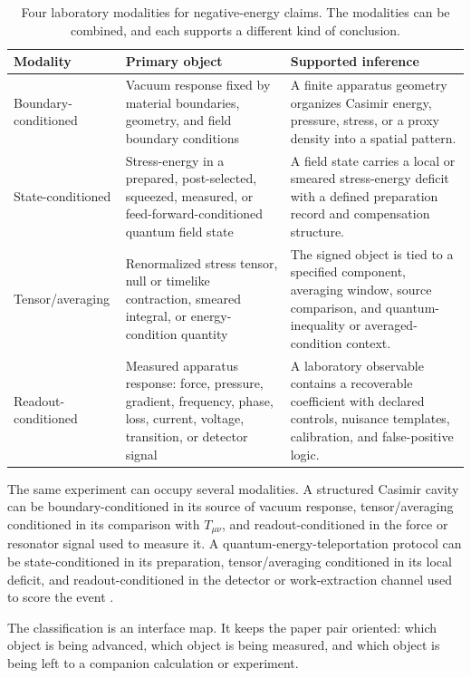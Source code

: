 \documentclass[11pt]{article}
\newcommand{\Tmunu}{T_{\mu\nu}}
\begin{document}
\begin{table}[h]
\centering
\small
\begin{tabularx}{\textwidth}{p{}p{}X}
\toprule
Modality & Primary object & Supported inference \\
\midrule
Boundary-conditioned &
Vacuum response fixed by material boundaries, geometry, and field boundary
conditions &
A finite apparatus geometry organizes Casimir energy, pressure, stress, or a
proxy density into a spatial pattern. \\
\addlinespace
State-conditioned &
Stress-energy in a prepared, post-selected, squeezed, measured, or
feed-forward-conditioned quantum field state &
A field state carries a local or smeared stress-energy deficit with a defined
preparation record and compensation structure. \\
\addlinespace
Tensor/averaging &
Renormalized stress tensor, null or timelike contraction, smeared integral, or
energy-condition quantity &
The signed object is tied to a specified component, averaging window, source
comparison, and quantum-inequality or averaged-condition context. \\
\addlinespace
Readout-conditioned &
Measured apparatus response: force, pressure, gradient, frequency, phase,
loss, current, voltage, transition, or detector signal &
A laboratory observable contains a recoverable coefficient with declared
controls, nuisance templates, calibration, and false-positive logic. \\
\bottomrule
\end{tabularx}
\caption{Four laboratory modalities for negative-energy claims. The
modalities can be combined, and each supports a different kind of conclusion.}
\label{tab:modalities}
\end{table}

The same experiment can occupy several modalities. A structured Casimir cavity
can be boundary-conditioned in its source of vacuum response, tensor/averaging
conditioned in its comparison with \(\Tmunu\), and readout-conditioned in the
force or resonator signal used to measure it. A quantum-energy-teleportation
protocol can be state-conditioned in its preparation, tensor/averaging
conditioned in its local deficit, and readout-conditioned in the detector or
work-extraction channel used to score the event \cite{FunaiMartinMartinez2017}.

The classification is an interface map. It keeps the paper pair oriented:
which object is being advanced, which object is being measured, and which
object is being left to a companion calculation or experiment.
\end{document}
